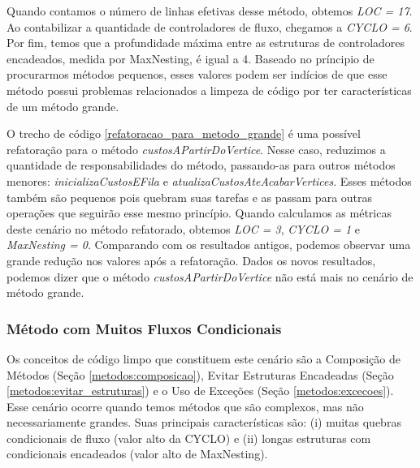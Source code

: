                                                            

Quando contamos o número de linhas efetivas desse método, obtemos \textit{LOC = 17}. Ao contabilizar a quantidade de controladores de fluxo, chegamos a \textit{CYCLO = 6}. Por fim, temos que a profundidade máxima entre as estruturas de controladores encadeados, medida por MaxNesting, é igual a 4. Baseado no príncipio de procurarmos métodos pequenos, esses valores podem ser indícios de que esse método possui problemas relacionados a limpeza de código por ter características de um método grande.
                                                      
O trecho de código \ref{refatoracao_para_metodo_grande} é uma possível refatoração para o método \textit{custosAPartirDoVertice}. Nesse caso, reduzimos a quantidade de responsabilidades do método, passando-as para outros métodos menores: \textit{inicializaCustosEFila} e \textit{atualizaCustosAteAcabarVertices}. Esses métodos também são pequenos pois quebram suas tarefas e as passam para outras operações que seguirão esse mesmo princípio. Quando calculamos as métricas deste cenário no método refatorado, obtemos \textit{LOC = 3}, \textit{CYCLO = 1} e \textit{MaxNesting = 0}. Comparando com os resultados antigos, podemos observar uma grande redução nos valores após a refatoração. Dados os novos resultados, podemos dizer que o método \textit{custosAPartirDoVertice} não está mais no cenário de método grande.

                                                            

	
\subsubsection{Método com Muitos Fluxos Condicionais}
                  
Os conceitos de código limpo que constituem este cenário são a Composição de Métodos (Seção \ref{metodos:composicao}), Evitar Estruturas Encadeadas (Seção \ref{metodos:evitar_estruturas}) e o Uso de Exceções (Seção \ref{metodos:excecoes}). Esse cenário ocorre quando temos métodos que são complexos, mas não necessariamente grandes. Suas principais características são: (i) muitas quebras condicionais de fluxo (valor alto da CYCLO) e (ii) longas estruturas com condicionais encadeados (valor alto de MaxNesting).
                                                                                 
